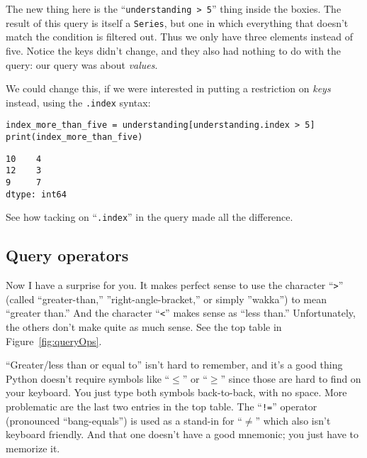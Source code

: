 The new thing here is the ``\texttt{understanding > 5}'' thing inside the
boxies. The result of this query is itself a \texttt{Series}, but one in which
everything that doesn't match the condition is filtered out. Thus we only have
three elements instead of five. Notice the keys didn't change, and they also
had nothing to do with the query: our query was about \textit{values}.


We could change this, if we were interested in putting a restriction on
\textit{keys} instead, using the \texttt{.index} syntax:

\begin{Verbatim}[fontsize=\small,samepage=true,frame=single,framesep=3mm]
index_more_than_five = understanding[understanding.index > 5]
print(index_more_than_five)
\end{Verbatim}

\begin{Verbatim}[fontsize=\small,samepage=true,frame=leftline,framesep=5mm,framerule=1mm]
10    4
12    3
9     7
dtype: int64
\end{Verbatim}

See how tacking on ``\texttt{.index}'' in the query made all the difference.

\subsection{Query operators}


Now I have a surprise for you. It makes perfect sense to use the character
``\texttt{>}'' (called ``greater-than,'' ''right-angle-bracket,'' or simply
''wakka'') to mean ``greater than.'' And the character ``\texttt{<}'' makes
sense as ``less than.'' Unfortunately, the others don't make quite as much
sense. See the top table in Figure~\ref{fig:queryOps}.


``Greater/less than or equal to'' isn't hard to remember, and it's a good thing
Python doesn't require symbols like ``$\le$'' or ``$\ge$'' since those are hard
to find on your keyboard. You just type both symbols back-to-back, with no
space. More problematic are the last two entries in the top table. The
``\texttt{!=}'' operator (pronounced ``bang-equals'') is used as a stand-in
for ``$\ne$'' which also isn't keyboard friendly. And that one doesn't have a
good mnemonic; you just have to memorize it.

